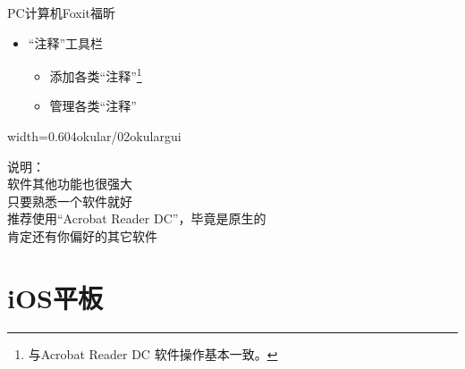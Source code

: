 \documentclass[fontset = none, t, aspectratio=169]{ctexbeamer}
\begin{document}
\begin{frame}{PC计算机}{Foxit福昕}
  \begin{itemize}
  \item \enquote{注释}工具栏
    \begin{itemize}
    \item 添加各类\enquote{注释}\footnote[frame,1]{与Acrobat Reader DC
        软件操作基本一致。}
    \item 管理各类\enquote{注释}
    \end{itemize}
  \end{itemize}
  \begin{center}
    \begin{annotationimage}{width=0.6\textwidth}{04okular/02okulargui}
    \end{annotationimage}
  \end{center}
\end{frame}
\begin{frame}
  说明：\\
  软件其他功能也很强大\\
  只要\alert{熟悉一个软件}就好\\
  \alert{推荐}使用\enquote{Acrobat Reader DC}，毕竟是\alert{原生的}\\
  肯定还有你偏好的其它软件
\end{frame}
\section{iOS平板}
\end{document}
